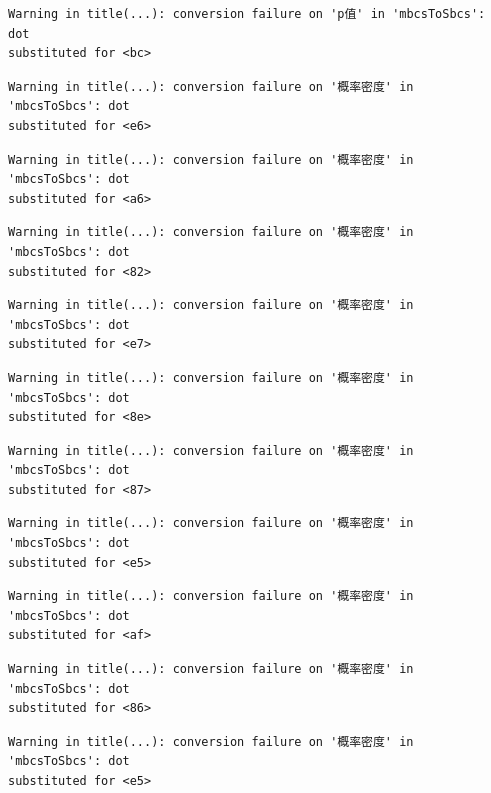\documentclass[
  letterpaper,
  DIV=11,
  numbers=noendperiod]{scrreprt}
\begin{document}
\begin{verbatim}
Warning in title(...): conversion failure on 'p值' in 'mbcsToSbcs': dot
substituted for <bc>
\end{verbatim}

\begin{verbatim}
Warning in title(...): conversion failure on '概率密度' in 'mbcsToSbcs': dot
substituted for <e6>
\end{verbatim}

\begin{verbatim}
Warning in title(...): conversion failure on '概率密度' in 'mbcsToSbcs': dot
substituted for <a6>
\end{verbatim}

\begin{verbatim}
Warning in title(...): conversion failure on '概率密度' in 'mbcsToSbcs': dot
substituted for <82>
\end{verbatim}

\begin{verbatim}
Warning in title(...): conversion failure on '概率密度' in 'mbcsToSbcs': dot
substituted for <e7>
\end{verbatim}

\begin{verbatim}
Warning in title(...): conversion failure on '概率密度' in 'mbcsToSbcs': dot
substituted for <8e>
\end{verbatim}

\begin{verbatim}
Warning in title(...): conversion failure on '概率密度' in 'mbcsToSbcs': dot
substituted for <87>
\end{verbatim}

\begin{verbatim}
Warning in title(...): conversion failure on '概率密度' in 'mbcsToSbcs': dot
substituted for <e5>
\end{verbatim}

\begin{verbatim}
Warning in title(...): conversion failure on '概率密度' in 'mbcsToSbcs': dot
substituted for <af>
\end{verbatim}

\begin{verbatim}
Warning in title(...): conversion failure on '概率密度' in 'mbcsToSbcs': dot
substituted for <86>
\end{verbatim}

\begin{verbatim}
Warning in title(...): conversion failure on '概率密度' in 'mbcsToSbcs': dot
substituted for <e5>
\end{verbatim}
\end{document}

